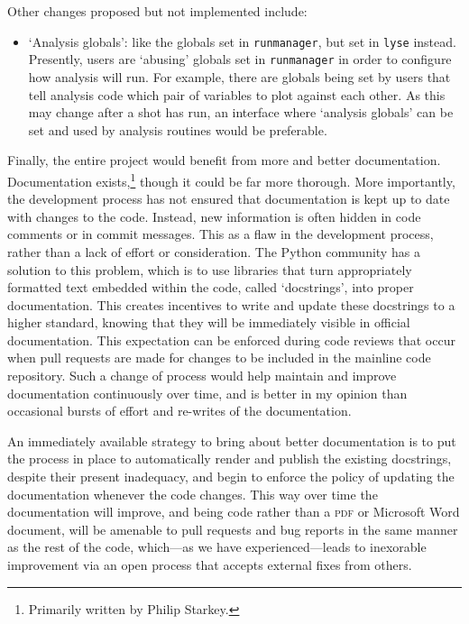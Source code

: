 Other changes proposed but not implemented include:

\begin{itemize}
\item `Analysis globals': like the globals set in \texttt{runmanager}, but set in \texttt{lyse} instead. Presently, users are `abusing' globals set in \texttt{runmanager} in order to configure how analysis will run. For example, there are globals being set by users that tell analysis code which pair of variables to plot against each other. As this may change after a shot has run, an interface where `analysis globals' can be set and used by analysis routines would be preferable.
\end{itemize}

Finally, the entire project would benefit from more and better documentation. Documentation exists,\footnote{Primarily written by Philip Starkey.} though it could be far more thorough. More importantly, the development process has not ensured that documentation is kept up to date with changes to the code. Instead, new information is often hidden in code comments or in commit messages. This as a flaw in the development process, rather than a lack of effort or consideration. The Python community has a solution to this problem, which is to use libraries that turn appropriately formatted text embedded within the code, called `docstrings', into proper documentation. This creates incentives to write and update these docstrings to a higher standard, knowing that they will be immediately visible in official documentation. This expectation can be enforced during code reviews that occur when pull requests are made for changes to be included in the mainline code repository. Such a change of process would help maintain and improve documentation continuously over time, and is better in my opinion than occasional bursts of effort and re-writes of the documentation.

An immediately available strategy to bring about better documentation is to put the process in place to automatically render and publish the existing docstrings, despite their present inadequacy, and begin to enforce the policy of updating the documentation whenever the code changes. This way over time the documentation will improve, and being code rather than a \textsc{pdf} or Microsoft Word document, will be amenable to pull requests and bug reports in the same manner as the rest of the code, which---as we have experienced---leads to inexorable improvement via an open process that accepts external fixes from others.


